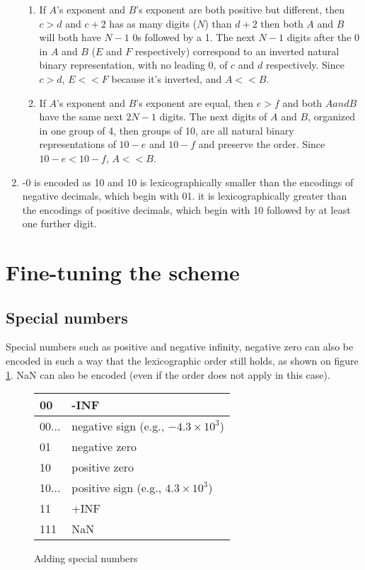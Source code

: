 \documentclass{acm_proc_article-sp}
\begin{document}
\begin{enumerate}
\begin{enumerate}
  \item If $A$'s exponent and $B$'s exponent are both positive but different, then $c > d$ and $c+2$ has as many digits ($N$) than $d+2$ then both $A$ and $B$ will both have $N-1$ 0s followed by a 1. The next $N-1$ digits after the 0 in $A$ and $B$ ($E$ and $F$ respectively) correspond to an inverted natural binary representation, with no leading 0, of $c$ and $d$ respectively. Since $c > d$, $E << F$ because it's inverted, and $A << B$.
  \item If $A$'s exponent and $B$'s exponent are equal, then $e > f$ and both $A and B$ have the same next $2N-1$ digits. The next digits of $A$ and $B$, organized in one group of 4, then groups of 10, are all natural binary representations of $10-e$ and $10-f$ and preserve the order. Since $10-e < 10-f$, $A << B$.
  \end{enumerate}
\item -0 is encoded as 10 and 10 is lexicographically smaller than the encodings of negative decimals, which begin with 01. it is lexicographically greater than the encodings of positive decimals, which begin with 10 followed by at least one further digit.
\end{enumerate}

\section{Fine-tuning the scheme}
\label{section-fine-tune}

\subsection{Special numbers}

Special numbers such as positive and negative infinity, negative zero can also be encoded in such a way that the lexicographic order still holds, as shown on figure \ref{figure-sign-extended}. NaN can also be encoded (even if the order does not apply in this case).

\begin{figure}
\caption{Adding special numbers}
\label{figure-sign-extended}
\center
\begin{tabular}{|l|l|}
\hline
00 & -INF \\
\hline
00... &  negative sign (e.g., $-4.3\times10^3$)\\
\hline
01 & negative zero \\
\hline
10 & positive zero \\
\hline
10... & positive sign (e.g., $4.3\times10^3$)\\
\hline
11 & +INF \\
\hline
111 & NaN \\
\hline
\end{tabular}
\end{figure}
\end{document}

